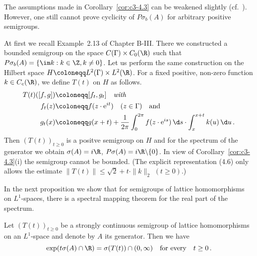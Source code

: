 The assumptions made in Corollary~\ref{cor:c3-4.3} can be weakened slightly (cf.\ \citet{greiner:1982}). 
However, one still cannot prove cyclicity of $P\sigma_{b}(A)$ for arbitrary positive semigroups.

\begin{example}\label{ex:c3-4.4}
	At first we recall Example~2.13 of Chapter B-III. 
	There we constructed a bounded semigroup on the space $C(\Gamma)\times C_{0}(\R )$ such that $P\sigma_{b}(A) = \{\im k : k \in \Z, k \neq 0\}$.
%
%
%
Let us perform the same construction on the Hilbert space
$H \coloneqq L^2(\Gamma)\times L^2(\R )$.
For a fixed positive, non-zero function $k \in C_c(\R )$,
we define $T(t)$ on $H$ as follows.
\begin{equation}\label{eq:c3-4.6}
	\begin{aligned} 
		T(t)([f,g]) &\coloneqq [f_t,g_t] \quad \textit{with}\\
		f_t(z) &\coloneqq f(z \cdot \mathrm{e}^{it}) \quad (z \in \Gamma) \quad \text{and}\\
		g_t(x) &\coloneqq g(x+t) + \frac{1}{2\pi}\int_{0}^{2\pi} f(z \cdot \mathrm{e}^{is}) \,\d s \cdot \int_{x}^{x+t} k(u) \,\d u\,.
	\end{aligned}
\end{equation}
Then $(T(t))_{t \geq 0}$ is a positve semigroup on $H$ and for the spectrum of
the generator we obtain $\sigma(A) = i\R $, $P\sigma(A) = i\R \backslash\{0\}$.
In view of Corollary~\ref{cor:c3-4.3}(i) the semigroup cannot be bounded.
(The explicit representation (4.6) only allows the estimate $\|T(t)\| \leq \sqrt{2} + t \cdot \|k\|_2$ $(t\geq 0)$.)
\end{example}

In the next proposition we show that for semigroups of lattice homomorphisms on $L^1$-spaces, there is a spectral mapping theorem for the
real part of the spectrum.

\begin{proposition}\label{prop:c3-4.5}
Let $(T(t))_{t \geq 0}$ be a strongly continuous semigroup
of lattice homomorphisms on an $L^1$-space and denote by $A$ its generator.
Then we have
\begin{equation}\label{eq:c3-4.7}
	\exp(t\sigma(A) \cap \R ) = \sigma(T(t)) \cap (0,\infty) \quad \text{for every} \quad t \geq 0\,.
\end{equation}
\end{proposition}

